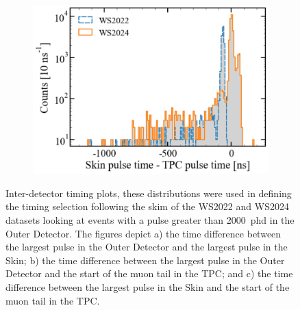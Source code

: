 \begin{figure}[ht!]
\begin{subfigure}{0.5\textwidth}
    \includegraphics[width=\textwidth]{figures/Muons/Skin-TPC_timing.pdf}
    \caption{}
    \label{fig:Muons/Skin-TPC}
\end{subfigure}
\caption{Inter-detector timing plots, these distributions were used in defining the timing selection following the skim of the WS2022 and WS2024 datasets looking at events with a pulse greater than 2000~phd in the Outer Detector. The figures depict a) the time difference between the largest pulse in the Outer Detector and the largest pulse in the Skin; b) the time difference between the largest pulse in the Outer Detector and the start of the muon tail in the TPC; and c) the time difference between the largest pulse in the Skin and the start of the muon tail in the TPC.}
\label{fig:Muons/timing_plots}
\end{figure}

